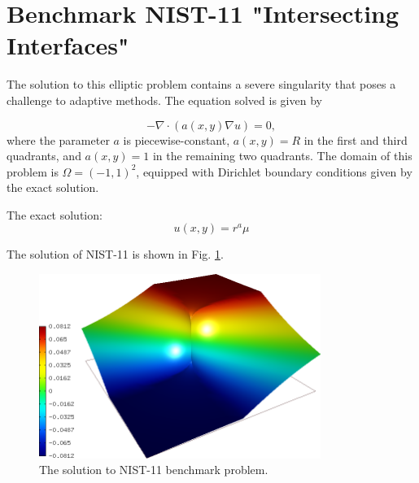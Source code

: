 \section{Benchmark NIST-11 "Intersecting Interfaces"}
\label{sec:bench-11}

The solution to this elliptic problem contains a severe
singularity that poses a challenge to adaptive methods.
The equation solved is given by

\begin{equation} \label{intersecting}
-\nabla \cdot (a(x,y) \nabla u) = 0,
\end{equation}
where the parameter $a$ is piecewise-constant,
$a(x,y) = R$ in the first and third quadrants,
and $a(x,y) = 1$ in the remaining two quadrants.
The domain of this problem is $\Omega = (-1, 1)^2$, equipped with
Dirichlet boundary conditions given by the exact solution.

The exact solution:
\begin{equation}\label{exact-nist-11}
u(x,y) = r^{a} \mu
\end{equation}

The solution of NIST-11 is shown in Fig. \ref{fig:sln-nist11}.

\begin{figure}[!ht]
\centering
\includegraphics[height=6cm]{nist/nist-11/solution.png}
\caption{The solution to NIST-11 benchmark problem.}
\label{fig:sln-nist11}
\end{figure}
